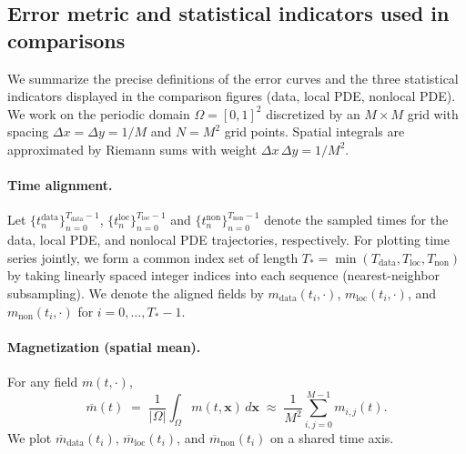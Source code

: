 \documentclass[11pt,a4paper]{article}
\begin{document}
\subsection{Error metric and statistical indicators used in comparisons}
\label{sec:error_and_stats}

We summarize the precise definitions of the error curves and the three statistical indicators displayed in the comparison figures (data, local PDE, nonlocal PDE). We work on the periodic domain $\Omega=[0,1]^2$ discretized by an $M\times M$ grid with spacing $\Delta x = \Delta y = 1/M$ and $N=M^2$ grid points. Spatial integrals are approximated by Riemann sums with weight $\Delta x\,\Delta y = 1/M^2$.

\paragraph{Time alignment.} Let $\{t^{\text{data}}_n\}_{n=0}^{T_{\text{data}}-1}$, $\{t^{\text{loc}}_n\}_{n=0}^{T_{\text{loc}}-1}$ and $\{t^{\text{non}}_n\}_{n=0}^{T_{\text{non}}-1}$ denote the sampled times for the data, local PDE, and nonlocal PDE trajectories, respectively. For plotting time series jointly, we form a common index set of length $T_\ast=\min(T_{\text{data}},T_{\text{loc}},T_{\text{non}})$ by taking linearly spaced integer indices into each sequence (nearest-neighbor subsampling). We denote the aligned fields by $m_{\text{data}}(t_i,\cdot)$, $m_{\text{loc}}(t_i,\cdot)$, and $m_{\text{non}}(t_i,\cdot)$ for $i=0,\dots,T_\ast-1$.

\paragraph{Magnetization (spatial mean).} For any field $m(t,\cdot)$,
\begin{equation}
    \overline{m}(t) \;=\; \frac{1}{|\Omega|} \int_{\Omega} m(t,\mathbf{x})\,d\mathbf{x}
    \;\approx\; \frac{1}{M^2} \sum_{i,j=0}^{M-1} m_{i,j}(t).
\end{equation}
We plot $\overline{m}_{\text{data}}(t_i)$, $\overline{m}_{\text{loc}}(t_i)$, and $\overline{m}_{\text{non}}(t_i)$ on a shared time axis.
\end{document}
